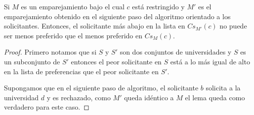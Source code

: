 \begin{lem}
\label{lemaAOA2}
Si $M$ es un emparejamiento bajo el cual $c$ está restringido y $M'$ es el emparejamiento obtenido en el siguiente paso del algoritmo orientado a los solicitantes. Entonces, el solicitante más abajo en la lista en  $Cs_{M'}(c)$ no puede ser menos preferido que el menos preferido en $Cs_M(c)$.
\end{lem}
\begin{proof}
Primero notamos que si $S$ y $S'$ son dos conjuntos de universidades y $S$ es un subconjunto de $S'$ entonces el peor solicitante en $S$ está a lo más igual de alto en la lista de preferencias que el peor solicitante en $S'$. 

Supongamos que en el siguiente paso de algoritmo, el solicitante $b$ solicita a la universidad $d$ y es rechazado, como $M'$ queda idéntico a $M$ el lema queda como verdadero para este caso. 


\end{proof}
